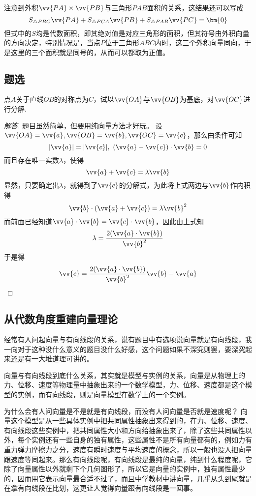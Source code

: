 \begin{example}
  注意到外积$\vv{PA}\times\vv{PB}$与三角形$PAB$面积的关系，这结果还可以写成
  \[ S_{\triangle PBC} \vv{PA} + S_{\triangle PCA} \vv{PB} + S_{\triangle PAB} \vv{PC} = \bm{0} \]
  但式中的$S$均是代数面积，即其绝对值是对应三角形的面积，但其符号由外积向量的方向决定，特别情况是，当点$P$位于三角形$ABC$内时，这三个外积向量同向，于是这里的三个面积就是同号的，从而可以都取为正值。
\end{example}

\subsection{题选}
\label{sec:题选}

\begin{exercise}
  点$A$关于直线$OB$的对称点为$C$，试以$\vv{OA}$与$\vv{OB}$为基底，对$\vv{OC}$进行分解.
\end{exercise}



\begin{proof}[解答]
  题目虽然简单，但要用纯向量方法才好玩。
设$\vv{OA}=\vv{a},\vv{OB}=\vv{b},\vv{OC}=\vv{c}$，那么由条件可知
\[ |\vv{a}|=|\vv{c}|, \  (\vv{a}-\vv{c}) \cdot \vv{b}=0 \]
而且存在唯一实数$\lambda$，使得
\[ \vv{a}+\vv{c}=\lambda \vv{b} \]
显然，只要确定出$\lambda$，就得到了$\vv{c}$的分解式，为此将上式两边与$\vv{b}$作内积得
\[ \vv{b} \cdot (\vv{a}+\vv{c})=\lambda \vv{b}^2 \]
而前面已经知道$\vv{a} \cdot \vv{b}=\vv{c} \cdot \vv{b}$，因此由上式知
\[ \lambda = \frac{2(\vv{a} \cdot \vv{b})}{\vv{b}^2} \]
于是得
\[ \vv{c} = \frac{2(\vv{a} \cdot \vv{b})}{\vv{b}^2} \vv{b} - \vv{a} \]
\end{proof}

\subsection{从代数角度重建向量理论}
\label{sec:algebra-vector}

经常有人问起向量与有向线段的关系，说有题目中有选项说向量就是有向线段，我一向对于这种没什么意义的题目没什么好感，这个问题如果不深究则罢，要深究起来还是有一大堆道理可讲的。

向量与有向线段到底什么关系，其实就是模型与实例的关系，向量是从物理上的力、位移、速度等物理量中抽象出来的一个数学模型，力、位移、速度都是这个模型的实例，而有向线段，则是向量模型在数学上的一个实例。

为什么会有人问向量是不是就是有向线段，而没有人问向量是否就是速度呢？
向量这个模型是从一些具体实例中把共同属性抽象出来得到的，在力、位移、速度、有向线段这些实例中，把共同属性大小和方向给抽象出来了，除了这些共同属性以外，每个实例还有一些自身的独有属性，这些属性不是所有向量都有的，例如力有重力弹力摩擦力之分，速度有瞬时速度与平均速度的概念，所以一般也没人把向量跟速度等同起来。那么有向线段呢，有向线段是最纯的向量，纯到什么程度呢，它除了向量属性以外就剩下个几何图形了，所以它是向量的实例中，独有属性最少的，因而用它表示向量最合适不过了，而且中学教材中讲向量，几乎从头到尾就是在拿有向线段在比划，这更让人觉得向量跟有向线段是一回事。

